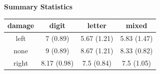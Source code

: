 \documentclass[]{article}
\begin{document}
\clearpage

\textbf{Summary Statistics}

\begin{longtable}[]{@{}cccc@{}}
\toprule
\begin{minipage}[b]{0.11\columnwidth}\centering\strut
damage\strut
\end{minipage} & \begin{minipage}[b]{0.17\columnwidth}\centering\strut
digit\strut
\end{minipage} & \begin{minipage}[b]{0.17\columnwidth}\centering\strut
letter\strut
\end{minipage} & \begin{minipage}[b]{0.17\columnwidth}\centering\strut
mixed\strut
\end{minipage}\tabularnewline
\midrule
\endhead
\begin{minipage}[t]{0.11\columnwidth}\centering\strut
left\strut
\end{minipage} & \begin{minipage}[t]{0.17\columnwidth}\centering\strut
7 (0.89)\strut
\end{minipage} & \begin{minipage}[t]{0.17\columnwidth}\centering\strut
5.67 (1.21)\strut
\end{minipage} & \begin{minipage}[t]{0.17\columnwidth}\centering\strut
5.83 (1.47)\strut
\end{minipage}\tabularnewline
\begin{minipage}[t]{0.11\columnwidth}\centering\strut
none\strut
\end{minipage} & \begin{minipage}[t]{0.17\columnwidth}\centering\strut
9 (0.89)\strut
\end{minipage} & \begin{minipage}[t]{0.17\columnwidth}\centering\strut
8.67 (1.21)\strut
\end{minipage} & \begin{minipage}[t]{0.17\columnwidth}\centering\strut
8.33 (0.82)\strut
\end{minipage}\tabularnewline
\begin{minipage}[t]{0.11\columnwidth}\centering\strut
right\strut
\end{minipage} & \begin{minipage}[t]{0.17\columnwidth}\centering\strut
8.17 (0.98)\strut
\end{minipage} & \begin{minipage}[t]{0.17\columnwidth}\centering\strut
7.5 (0.84)\strut
\end{minipage} & \begin{minipage}[t]{0.17\columnwidth}\centering\strut
7.5 (1.05)\strut
\end{minipage}\tabularnewline
\bottomrule
\end{longtable}
\end{document}
